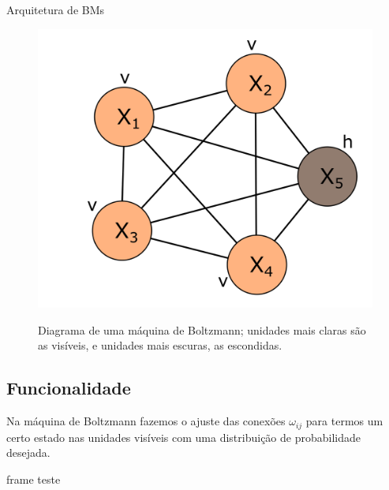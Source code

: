 \begin{frame}{Arquitetura de BMs}%
  \begin{figure}[h]{}%
    \label{fig:bm-diagram}%
    \includegraphics[scale=0.5]{images/bm_2.png}
    \caption{Diagrama de uma máquina de Boltzmann; unidades mais claras são as visíveis, e unidades mais escuras, as escondidas.}
  \end{figure}
\end{frame}

\subsection{Funcionalidade}%
\begin{frame}{}%
  \justiying%
  Na máquina de Boltzmann fazemos o ajuste das conexões $\omega_{ij}$ para termos um certo estado nas unidades visíveis com uma distribuição de probabilidade desejada.
\end{frame}


\begin{frame}{frame teste}
%  
\end{frame}
